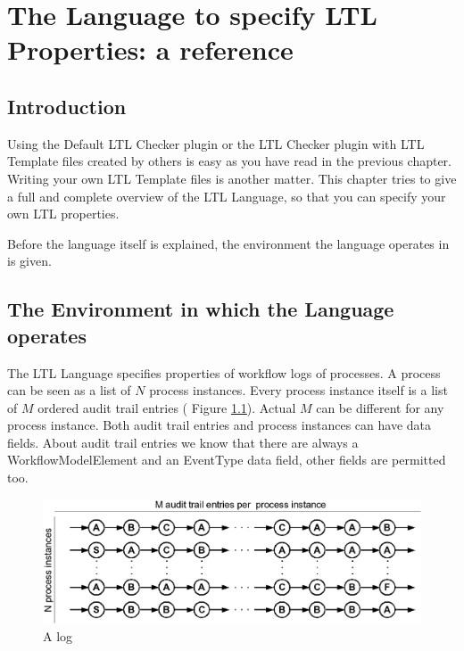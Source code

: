 \chapter[LTL Language]{The Language to specify LTL Properties: a reference}
\label{language}

\section{Introduction}
\label{language:introduction}

Using the Default LTL Checker plugin or the LTL Checker plugin with
LTL Template files created by others is easy as you have read in the previous
chapter. Writing your own LTL Template files is another matter. This chapter
tries to give a full and complete overview of the LTL Language, so that you
can specify your own LTL properties.

Before the language itself is explained, the environment the language operates
in is given.

\section{The Environment in which the Language operates}
\label{language:environment}

The LTL Language specifies properties of workflow logs of processes. A process
can be seen as a list of $N$ process instances. Every process instance itself
is a list of $M$ ordered audit trail entries ( Figure \ref{language:log}).
Actual $M$ can be different for any process instance. Both audit trail entries and
process instances can have data fields. About audit trail entries we know that
there are always a WorkflowModelElement and an EventType data field, other fields are permitted too.

\begin{figure}[H]
    \includegraphics[scale=0.30]{diagrams/log-diagram.eps}
    \caption{A log}
    \label{language:log}
\end{figure}

